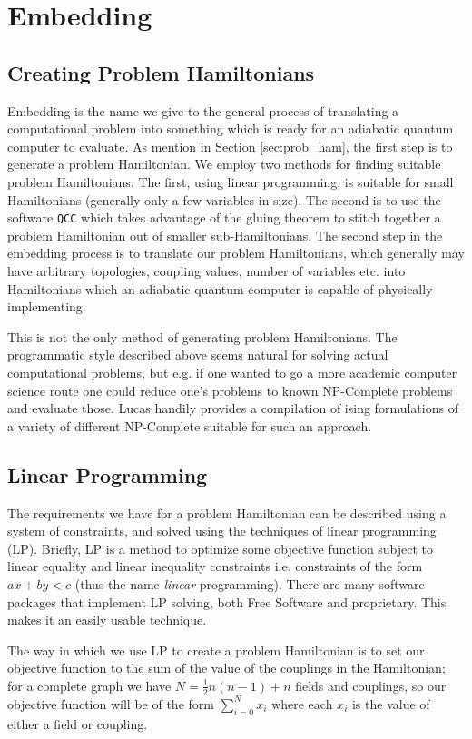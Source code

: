 \chapter{Embedding}
\section{Creating Problem Hamiltonians}
Embedding is the name we give to the general process of translating a computational problem into something which is ready for an adiabatic quantum computer to evaluate.  As mention in Section \ref{sec:prob_ham}, the first step is to generate a problem Hamiltonian.  We employ two methods for finding suitable problem Hamiltonians.  The first, using linear programming, is suitable for small Hamiltonians (generally only a few variables in size).  The second is to use the software \texttt{QCC} which takes advantage of the gluing theorem to stitch together a problem Hamiltonian out of smaller sub-Hamiltonians.
The second step in the embedding process is to translate our problem Hamiltonians, which generally may have arbitrary topologies, coupling values, number of variables etc. into Hamiltonians which an adiabatic quantum computer is capable of physically implementing.

This is not the only method of generating problem Hamiltonians.  The programmatic style described above seems natural for solving actual computational problems, but e.g. if one wanted to go a more academic computer science route one could reduce one's problems to known NP-Complete problems and evaluate those.  Lucas \cite{lucas} handily provides a compilation of ising formulations of a variety of different NP-Complete suitable for such an approach.

\section{Linear Programming}
The requirements we have for a problem Hamiltonian can be described using a system of constraints, and solved using the techniques of linear programming (LP).
Briefly, LP is a method to optimize some objective function subject to linear equality and linear inequality constraints i.e. constraints of the form $ax + by < c$ (thus the name \emph{linear} programming).  There are many software packages that implement LP solving, both Free Software and proprietary.  This makes it an easily usable technique.

The way in which we use LP to create a problem Hamiltonian is to set our objective function to the sum of the value of the couplings in the Hamiltonian; for a complete graph we have $N = \frac{1}{2}n(n-1) + n$ fields and couplings, so our objective function will be of the form $\sum_{i=0}^N x_i$ where each $x_i$ is the value of either a field or coupling.

